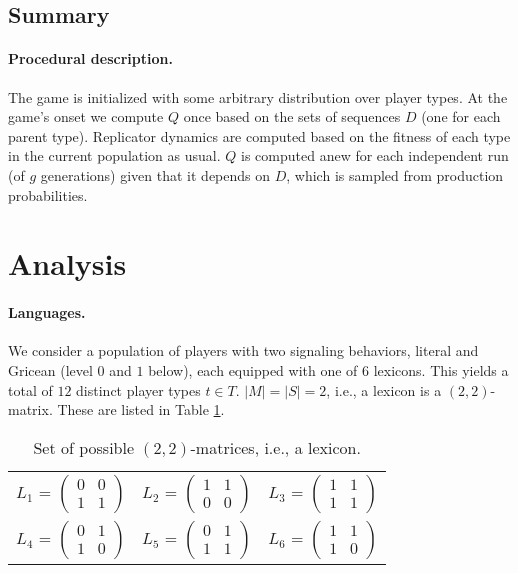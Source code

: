 \documentclass[a4paper]{article}
\begin{document}
\subsection{Summary}
\paragraph{Procedural description.} The game is initialized with some arbitrary distribution over player types. At the game's onset we compute $Q$ once based on the sets  of sequences $D$ (one for each parent type). Replicator dynamics are computed based on the fitness of each type in the current population as usual. $Q$ is computed anew for each independent run (of $g$ generations) given that it depends on $D$, which is sampled from production probabilities.


\section{Analysis}

\paragraph{Languages.} We consider a population of players with two signaling behaviors, literal and Gricean (level $0$ and $1$ below), each equipped with one of $6$ lexicons. This yields a total of $12$ distinct player types $t \in T$. $|M| = |S| = 2$, i.e., a lexicon is a $(2,2)$-matrix. These are listed in Table \ref{tab:lexica}. 

\begin{table}[h]
\centering 
\begin{tabular}{l c l}
$L_1$ = $\begin{pmatrix} 0 & 0 \\ 1 & 1 \end{pmatrix}$ & 
$L_2$ = $\begin{pmatrix} 1 & 1 \\ 0 & 0 \end{pmatrix}$ & 
$L_3$ = $\begin{pmatrix} 1 & 1 \\ 1 & 1 \end{pmatrix}$\\[0.5cm]

$L_4$ = $\begin{pmatrix} 0 & 1 \\ 1 & 0 \end{pmatrix}$ &
$L_5$ = $\begin{pmatrix} 0 & 1 \\ 1 & 1 \end{pmatrix}$ &
$L_6$ = $\begin{pmatrix} 1 & 1 \\ 1 & 0 \end{pmatrix}$
\end{tabular}
\caption{{\footnotesize Set of possible $(2,2)$-matrices, i.e., a lexicon.}}
\label{tab:lexica}
\end{table}
\end{document}
